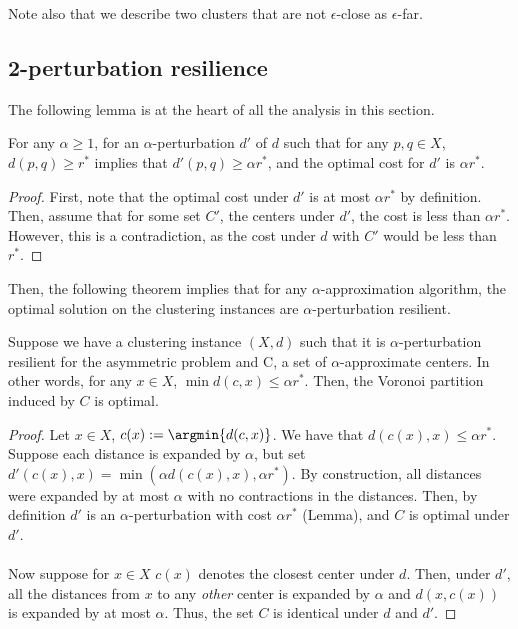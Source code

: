 \begin{remark}
Note also that we describe two clusters that are not $\epsilon$-close as $\epsilon$-far.
\end{remark}

\subsection{2-perturbation resilience}

The following lemma is at the heart of all the analysis in this section.

\begin{lemma}
For any $\alpha\geq1$, for an $\alpha$-perturbation $d'$ of $d$ such that for any $p,q\in X$, $d(p,q)\geq r^*$ implies that $d'(p,q)\geq\alpha r^*$, and the optimal cost for $d'$ is $\alpha r^*$.
\end{lemma}

\begin{proof}
First, note that the optimal cost under $d'$ is at most $\alpha r^*$ by definition. Then, assume that for some set $C'$, the centers under $d'$, the cost is less than $\alpha r^*$. However, this is a contradiction, as the cost under $d$ with $C'$ would be less than $r^*$.
\end{proof}

Then, the following theorem implies that for any $\alpha$-approximation algorithm, the optimal solution on the clustering instances are $\alpha$-perturbation resilient.

\begin{theorem}
Suppose we have a clustering instance $(X,d)$ such that it is $\alpha$-perturbation resilient for the asymmetric problem and C, a set of $\alpha$-approximate centers. In other words, for any $x\in X$, $\min d(c,x)\leq\alpha r^*$. Then, the Voronoi partition induced by $C$ is optimal.
\end{theorem}

\begin{proof}
Let $x\in X$, $c(x):=\argmin{d(c,x)}$. We have that $d(c(x),x)\leq\alpha r^*$. Suppose each distance is expanded by $\alpha$, but set $d'(c(x),x)=\min(\alpha d(c(x),x),\alpha r^*)$. By construction, all distances were expanded by at most $\alpha$ with no contractions in the distances. Then, by definition $d'$ is an $\alpha$-perturbation with cost $\alpha r^*$ (Lemma), and $C$ is optimal under $d'$.\\\\

Now suppose for $x\in X$ $c(x)$ denotes the closest center under $d$. Then, under $d'$, all the distances from $x$ to any \emph{other} center is expanded by $\alpha$ and $d(x,c(x))$ is expanded by at most $\alpha$. Thus, the set $C$ is identical under $d$ and $d'$.
\end{proof}

